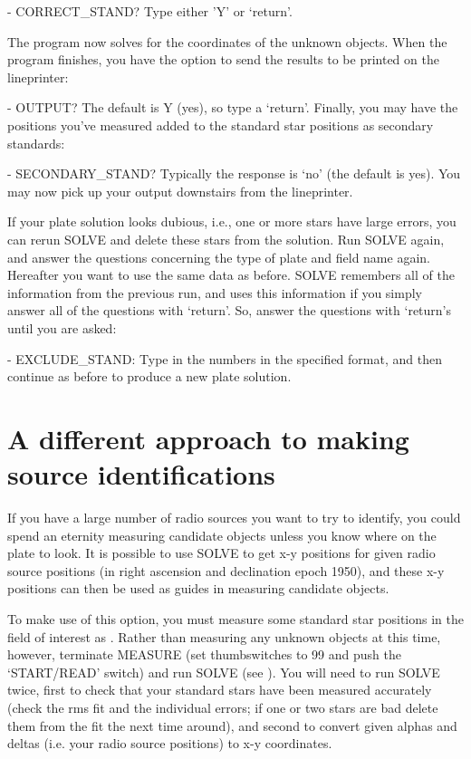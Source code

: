- CORRECT\_STAND? Type either 'Y' or `return'. 

The program now solves for the coordinates of the unknown objects. When the
program finishes, you have the option to send the results to be printed on the
lineprinter: 

- OUTPUT? The default is Y (yes), so type a `return'.  Finally, you may have
the positions you've measured added to the standard star positions as secondary
standards: 

- SECONDARY\_STAND? Typically the response is `no' (the default is yes).  You
may now pick up your output downstairs from the lineprinter. 

If your plate solution looks dubious, i.e., one or more stars have large
errors, you can rerun SOLVE and delete these stars from the solution.  Run
SOLVE again, and answer the questions concerning the type of plate and field
name again.  Hereafter you want to use the same data as before.  SOLVE
remembers all of the information from the previous run, and uses this
information if you simply answer all of the questions with `return'.  So,
answer the questions with `return's until you are asked: 

- EXCLUDE\_STAND: Type in the numbers in the specified format, and then
continue as before to produce a new plate solution. 


\section{A different approach to making source identifications} 
\label{.diff} 


If you have a large number of radio sources you want to try to identify, you
could spend an eternity measuring candidate objects unless you know where on
the plate to look.  It is possible to use SOLVE to get x-y positions for given
radio source positions (in right ascension and declination epoch 1950), and
these x-y positions can then be used as guides in measuring candidate objects. 

To make use of this option, you must measure some standard star positions in
the field of interest as . Rather than
measuring any unknown objects at this time, however, terminate MEASURE (set
thumbswitches to 99 and push the `START/READ' switch) and run SOLVE (see 
). You will need to run SOLVE twice, first to check
that your standard stars have been measured accurately (check the rms fit and
the individual errors; if one or two stars are bad delete them from the fit the
next time around), and second to convert given alphas and deltas (i.e. your
radio source positions) to x-y coordinates. 


